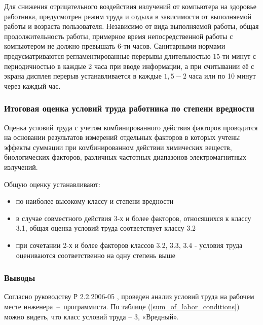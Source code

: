 Для снижения отрицательного воздействия излучений от компьютера
на здоровье работника, предусмотрен режим труда и отдыха в зависимости от выполняемой
работы и возраста пользователя. Независимо от вида выполняемой работы, общая
продолжительность работы, примерное время непосредственной работы с компьютером
не должно превышать 6-ти часов. Санитарными нормами предусматриваются регламентированные
перерывы длительностью 15-ти минут с периодичностью в каждые 2 часа при вводе
информации, а при считывании её с экрана дисплея перерыв устанавливается в
каждые $1,5 - 2$ часа или по 10 минут через каждый час.




\subsubsection{Итоговая оценка условий труда работника по степени вредности}

Оценка условий труда с учетом комбинированного действия факторов проводится на
основании результатов измерений отдельных факторов в которых учтены эффекты
суммации при комбинированном действии химических веществ, биологических факторов,
различных частотных диапазонов электромагнитных излучений.

Общую оценку устанавливают:

\begin{itemize}
    \item   по наиболее высокому классу и степени вредности
    \item   в случае совместного действия 3-х и более факторов, относящихся к классу
            3.1, общая оценка условий труда соответствует классу 3.2
    \item   при сочетании 2-х и более факторов классов 3.2, 3.3, 3.4 - условия
            труда оцениваются соответственно на одну степень выше
\end{itemize}



\subsubsection{Выводы}

Согласно руководству Р 2.2.2006-05 \cite{ecology_man_2_2_2006_05}, проведен анализ
условий труда на рабочем месте инженера~--~программиста. По таблице
(\ref{sum_of_labor_conditions}) можно видеть, что класс условий труда – 3, «Вредный».
